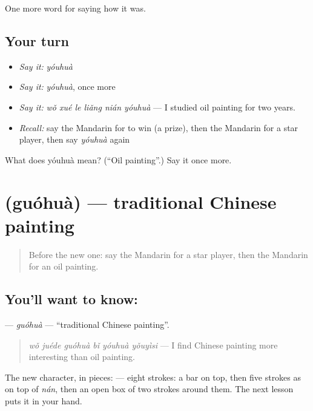 \begin{grammarlens}[title={What you've built}]
One more word for saying how it was.
\end{grammarlens}

\subsection*{Your turn}
\begin{itemize}
\raggedright
  \item \emph{Say it:} \emph{yóuhuà}
  \item \emph{Say it:} \emph{yóuhuà}, once more
  \item \emph{Say it:} \emph{wǒ xué le liǎng nián yóuhuà} — I studied oil painting for two years.
  \item \emph{Recall:} say the Mandarin for to win (a prize), then the Mandarin for a star player, then say \emph{yóuhuà} again
\end{itemize}

\begin{tcolorbox}[breakable,colback=teal!4,colframe=teal!35!black,title={Before you move on}]
What does yóuhuà mean? (\textquotedblleft{}Oil painting\textquotedblright{}.) Say it once more.
\end{tcolorbox}
\section[\texorpdfstring{\zh{国画} (guóhuà)}{国画 (guóhuà)}]{ (guóhuà) — traditional Chinese painting}

\label{lesson:ZH-C502-guohua}



\begin{quote}
Before the new one: say the Mandarin for a star player, then the Mandarin for an oil painting.
\end{quote}

\subsection*{You'll want to know: }
\textbf{} — \emph{guóhuà} — \textquotedblleft{}traditional Chinese painting\textquotedblright{}.

\begin{quote}
\emph{wǒ juéde guóhuà bǐ yóuhuà yǒuyìsi} — I find Chinese painting more interesting than oil painting.
\end{quote}

The new character, in pieces:  — eight strokes: a bar on top, then five strokes as on top of  \emph{nán}, then an open box of two strokes around them. The next lesson puts it in your hand.

